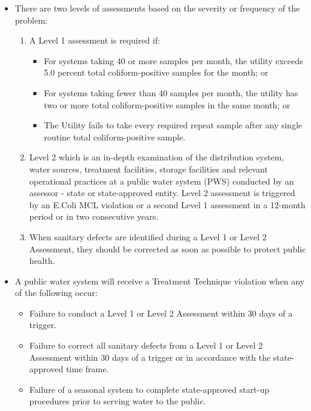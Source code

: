 \begin{itemize}
\item There are two levels of assessments based on the severity or frequency of the problem:
\begin{enumerate}
\item A Level 1 assessment is required if:
\begin{itemize}
\item For systems taking 40 or more samples per month, the utility exceeds 5.0 percent total coliform-positive samples for the month; or
\item For systems taking fewer than 40 samples per month, the utility has two or more total coliform-positive samples in the same month; or
\item The Utility fails to take every required repeat sample after any single routine total coliform-positive sample.
\end{itemize}

\item Level 2 which is an in-depth examination of the distribution system, water sources, treatment facilities, storage facilities and relevant operational practices at a public water system (PWS) conducted by an assessor - state or state-approved entity. Level 2 assessment is triggered by an E.Coli MCL violation or a second Level 1 assessment in a 12-month period or in two consecutive years.
\item When sanitary defects are identified during a Level 1 or Level 2 Assessment, they should be corrected as soon as possible to protect public health.
\end{enumerate}

\item A public water system will receive a Treatment Technique violation when any of the following occur:
\begin{itemize}
\item Failure to conduct a Level 1 or Level 2 Assessment within 30 days of a trigger.
\item Failure to correct all sanitary defects from a Level 1 or Level 2 Assessment within
30 days of a trigger or in accordance with the state-approved time frame.
\item Failure of a seasonal system to complete state-approved start-up procedures prior to serving water to the public.
\end{itemize}
\end{itemize}

